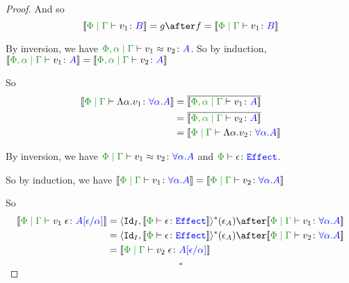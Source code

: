 \documentclass{report}
\begin{document}
\begin{framed}
\begin{proof}
        
        
        And so
        \begin{equation}
                \deno{\gpetyperelation{v_1}{B}} = g \after f = \deno{\gpetyperelation{v_1}{B}}
        \end{equation}
        
        \case{\eqgen}
        By inversion, we have $\eberelation{\P,\a}{\G}{v_1}{v_2}{A}$. So by induction, $\deno{\etyperelation{\P,\a}{\G}{v_1}{A}} = \deno{\etyperelation{\P,\a}{\G}{v_2}{A}}$
        
        So \begin{align*}
            \deno{\gpetyperelation{\elam{\a}{v_1}}{\all{\a}{A}}} & = \bar{\deno{\etyperelation{\P,\a}{\G}{v_1}{A}}}\\
            & = \bar{\deno{\etyperelation{\P,\a}{\G}{v_2}{A}}}\\
            & = \deno{\gpetyperelation{\elam{\a}{v_2}}{\all{\a}{A}}} 
        \end{align*}
        
        \case{\eqspec}
        
        By inversion, we have $\gpeberelation{v_1}{v_2}{\all{\a}{A}}$ and $\typerelation{\P}{\e}{\effect}$.
        
        So by induction, we have $\deno{\gpetyperelation{v_1}{\all{\a}{A}}} = \deno{\gpetyperelation{v_2}{\all{\a}{A}}}$
        
        So
        \begin{align*}
            \deno{\gpetyperelation{\eapp{v_1}{\e}}{A\ssub{\a}{\e}}} & = \pr{\Id{I}}{\deno{\typerelation{\P}{\e}{\effect}}}\star(\e_{A})\after\deno{\gpetyperelation{v_1}{\all{\a}{A}}}
            \\
            & = \pr{\Id{I}}{\deno{\typerelation{\P}{\e}{\effect}}}\star(\e_{A})\after\deno{\gpetyperelation{v_2}{\all{\a}{A}}}
            \\
            & = \deno{\gpetyperelation{\eapp{v_2}{\e}}{A\ssub{\a}{\e}}}
        \end{align*}
        $$\square$$
    \end{proof}
    
\end{framed}
    
\end{document}
